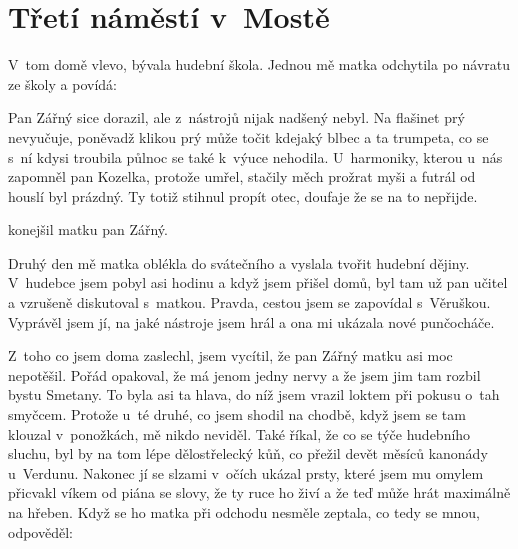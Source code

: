 
\chapter{Třetí náměstí v~Mostě}

V~tom domě vlevo, bývala hudební škola. Jednou mě matka odchytila po návratu
ze školy a povídá: 

Pan Zářný sice dorazil, ale z~nástrojů nijak nadšený nebyl. Na flašinet prý
nevyučuje, poněvadž klikou prý může točit kdejaký blbec a ta trumpeta, co se
s~ní kdysi troubila půlnoc se také k~výuce nehodila. U~harmoniky, kterou u~nás
zapomněl pan Kozelka, protože umřel, stačily měch prožrat myši a futrál od
houslí byl prázdný. Ty totiž stihnul propít otec, doufaje že se na to nepřijde.

 konejšil matku pan Zářný.

Druhý den mě matka oblékla do svátečního a vyslala tvořit hudební dějiny.
V~hudebce jsem pobyl asi hodinu a když jsem přišel domů, byl tam už pan učitel
a vzrušeně diskutoval s~matkou. Pravda, cestou jsem se zapovídal s~Věruškou.
Vyprávěl jsem jí, na jaké nástroje jsem hrál a ona mi ukázala nové punčocháče.

Z~toho co jsem doma zaslechl, jsem vycítil, že pan Zářný matku asi moc
nepotěšil. Pořád opakoval, že má jenom jedny nervy a že jsem jim tam rozbil
bystu Smetany. To byla asi ta hlava, do níž jsem vrazil loktem při pokusu o~tah
smyčcem. Protože u~té druhé, co jsem shodil na chodbě, když jsem se tam klouzal
v~ponožkách, mě nikdo neviděl. Také říkal, že co se týče hudebního sluchu, byl
by na tom lépe dělostřelecký kůň, co přežil devět měsíců kanonády u~Verdunu.
Nakonec jí se slzami v~očích ukázal prsty, které jsem mu omylem přicvakl víkem
od piána se slovy, že ty ruce ho živí a že teď může hrát maximálně na hřeben.
Když se ho matka při odchodu nesměle zeptala, co tedy se mnou, odpověděl:

